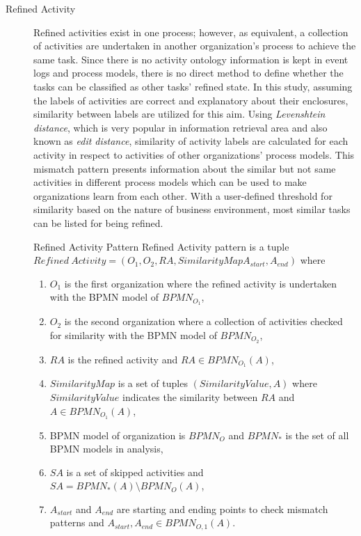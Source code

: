 \begin{description}
  \item[Refined Activity] Refined activities exist in one process; however, as equivalent, a collection of activities are undertaken in another organization's process to achieve the same task. Since there is no activity ontology information is kept in event logs and process models, there is no direct method to define whether the tasks can be classified as other tasks' refined state. In this study, assuming the labels of activities are correct and explanatory about their enclosures, similarity between labels are utilized for this aim. Using \textit{Levenshtein distance}, which is very popular in information retrieval area and also known as \textit{edit distance}, similarity of activity labels are calculated for each activity in respect to activities of other organizations' process models. This mismatch pattern presents information about the similar but not same activities in different process models which can be used to make organizations learn from each other. With a user-defined threshold for similarity based on the nature of business environment, most similar tasks can be listed for being refined.
		\theoremstyle{definition}
		\begin{definition}{Refined Activity Pattern}
		Refined Activity pattern is a tuple ${Refined\ Activity} = (O_{1}, O_{2}, RA, SimilarityMap A_{start}, A_{end}) $ where 
		\begin{enumerate}
		  \item $O_{1}$ is the first organization where the refined activity is undertaken with the BPMN model of $BPMN_{{O}_{1}}$,
		  \item $O_{2}$ is the second organization where a collection of activities checked for similarity with the BPMN model of $BPMN_{{O}_{2}}$,
		  \item $RA$ is the refined activity and $RA \in BPMN_{{O}_{1}}(A)$,
		  \item $SimilarityMap$ is a set of tuples $(SimilarityValue, A)$ where $SimilarityValue$ indicates the similarity between $RA$ and $A \in BPMN_{{O}_{1}}(A)$, 
		  \item BPMN model of organization is $BPMN_{O}$ and $BPMN_{*}$ is the set of all BPMN models in analysis,
		  \item $SA$ is a set of skipped activities and $SA =  BPMN_{*}(A) \setminus BPMN_{O}(A)$,
 		  \item $A_{start}$ and $A_{end}$ are starting and ending points to check mismatch patterns and $A_{start}, A_{end} \in BPMN_{O,1}(A)$.
		\end{enumerate}
		\end{definition}
\end{description}


